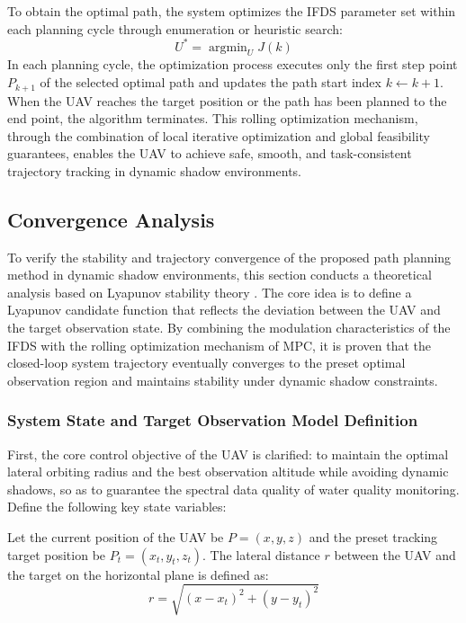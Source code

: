 \documentclass[final,3p,times,numbers]{elsarticle}
\begin{document}
To obtain the optimal path, the system optimizes the IFDS parameter set within each planning cycle through enumeration or heuristic search:
\begin{equation}
U^* = \mathop{\arg\min}_{U} J(k)
\end{equation}
In each planning cycle, the optimization process executes only the first step point $P_{k+1}$ of the selected optimal path and updates the path start index $k \leftarrow k+1$. When the UAV reaches the target position or the path has been planned to the end point, the algorithm terminates. This rolling optimization mechanism, through the combination of local iterative optimization and global feasibility guarantees, enables the UAV to achieve safe, smooth, and task-consistent trajectory tracking in dynamic shadow environments.

\subsection{Convergence Analysis}
To verify the stability and trajectory convergence of the proposed path planning method in dynamic shadow environments, this section conducts a theoretical analysis based on Lyapunov stability theory \cite{ref:75}. The core idea is to define a Lyapunov candidate function that reflects the deviation between the UAV and the target observation state. By combining the modulation characteristics of the IFDS with the rolling optimization mechanism of MPC, it is proven that the closed-loop system trajectory eventually converges to the preset optimal observation region and maintains stability under dynamic shadow constraints.

\subsubsection{System State and Target Observation Model Definition}
First, the core control objective of the UAV is clarified: to maintain the optimal lateral orbiting radius and the best observation altitude while avoiding dynamic shadows, so as to guarantee the spectral data quality of water quality monitoring. Define the following key state variables:

Let the current position of the UAV be $P=(x,y,z)$ and the preset tracking target position be $P_t=(x_t,y_t,z_t)$. The lateral distance $r$ between the UAV and the target on the horizontal plane is defined as:
\begin{equation}
r = \sqrt{(x-x_t)^2 + (y-y_t)^2} \label{eq:3-18}
\end{equation}
\end{document}
